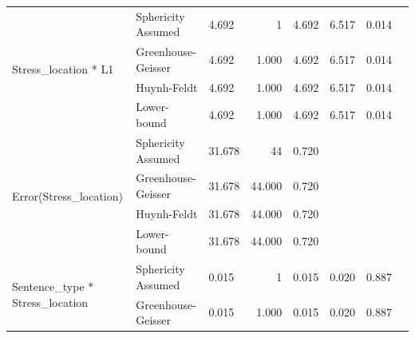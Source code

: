 \documentclass[a4paper]{article}
\begin{document}
\begin{table}[H]
\begin{center}
\begin{tabular}{p{}p{}|l|r|r|r|r|r|}
\hline
\multirow{4}{*}{Stress\_location * L1}                  & Sphericity Assumed & 4.692                             & 1                       & 4.692                            & 6.517                  & 0.014                      \\ 
\cline{2-7}
                                                        & Greenhouse-Geisser & 4.692                             & 1.000                   & 4.692                            & 6.517                  & 0.014                      \\ 
\cline{2-7}
                                                        & Huynh-Feldt        & 4.692                             & 1.000                   & 4.692                            & 6.517                  & 0.014                      \\ 
\cline{2-7}
                                                        & Lower-bound        & 4.692                             & 1.000                   & 4.692                            & 6.517                  & 0.014                      \\ 
\hline
\multirow{4}{*}{Error(Stress\_location)}                & Sphericity Assumed & 31.678                            & 44                      & 0.720                            & \multicolumn{1}{l|}{~} & \multicolumn{1}{l|}{~}     \\ 
\cline{2-7}
                                                        & Greenhouse-Geisser & 31.678                            & 44.000                  & 0.720                            & \multicolumn{1}{l|}{~} & \multicolumn{1}{l|}{~}     \\ 
\cline{2-7}
                                                        & Huynh-Feldt        & 31.678                            & 44.000                  & 0.720                            & \multicolumn{1}{l|}{~} & \multicolumn{1}{l|}{~}     \\ 
\cline{2-7}
                                                        & Lower-bound        & 31.678                            & 44.000                  & 0.720                            & \multicolumn{1}{l|}{~} & \multicolumn{1}{l|}{~}     \\ 
\hline
\multirow{4}{*}{Sentence\_type * Stress\_location}      & Sphericity Assumed & 0.015                             & 1                       & 0.015                            & 0.020                  & 0.887                      \\ 
\cline{2-7}
                                                        & Greenhouse-Geisser & 0.015                             & 1.000                   & 0.015                            & 0.020                  & 0.887                      \\ 

\end{tabular}
\end{center}
\end{table}
\end{document}
